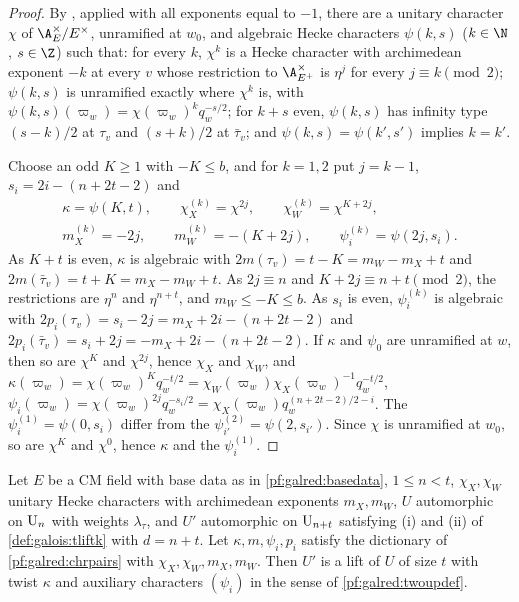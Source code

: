 \begin{proof}
By , applied with all exponents equal to $-1$, there are a unitary character
$\chi$ of $\A_E^\times/E^\times$, unramified at $w_0$, and algebraic Hecke characters $\psi(k,s)$ ($k\in\N$, $s\in\Z$) such
that: for every $k$, $\chi^k$ is a Hecke character with archimedean exponent $-k$ at every $v$ whose restriction to
$\A_{E^+}^\times$ is $\eta^j$ for every $j\equiv k\pmod2$; $\psi(k,s)$ is unramified exactly where $\chi^k$ is, with
$\psi(k,s)(\varpi_w)=\chi(\varpi_w)^kq_w^{-s/2}$; for $k+s$ even, $\psi(k,s)$ has infinity type $(s-k)/2$ at $\tau_v$ and
$(s+k)/2$ at $\bar\tau_v$; and $\psi(k,s)=\psi(k',s')$ implies $k=k'$.

Choose an odd $K\ge1$ with $-K\le b$, and for $k=1,2$ put $j=k-1$, $s_i=2i-(n+2t-2)$ and
\begin{gather*}
  \kappa=\psi(K,t),\qquad\chi^{(k)}_X=\chi^{2j},\qquad\chi^{(k)}_W=\chi^{K+2j},\\
  m^{(k)}_X=-2j,\qquad m^{(k)}_W=-(K+2j),\qquad\psi^{(k)}_i=\psi(2j,s_i).
\end{gather*}
As $K+t$ is even, $\kappa$ is algebraic with $2m(\tau_v)=t-K=m_W-m_X+t$ and $2m(\bar\tau_v)=t+K=m_X-m_W+t$. As $2j\equiv n$ and
$K+2j\equiv n+t\pmod2$, the restrictions are $\eta^n$ and $\eta^{n+t}$, and $m_W\le-K\le b$. As $s_i$ is even,
$\psi^{(k)}_i$ is algebraic with $2p_i(\tau_v)=s_i-2j=m_X+2i-(n+2t-2)$ and $2p_i(\bar\tau_v)=s_i+2j=-m_X+2i-(n+2t-2)$. If
$\kappa$ and $\psi_0$ are unramified at $w$, then so are $\chi^K$ and $\chi^{2j}$, hence $\chi_X$ and $\chi_W$, and
$\kappa(\varpi_w)=\chi(\varpi_w)^Kq_w^{-t/2}=\chi_W(\varpi_w)\chi_X(\varpi_w)^{-1}q_w^{-t/2}$,
$\psi_i(\varpi_w)=\chi(\varpi_w)^{2j}q_w^{-s_i/2}=\chi_X(\varpi_w)q_w^{(n+2t-2)/2-i}$. The $\psi^{(1)}_i=\psi(0,s_i)$ differ
from the $\psi^{(2)}_{i'}=\psi(2,s_{i'})$. Since $\chi$ is unramified at $w_0$, so are $\chi^K$ and $\chi^0$, hence $\kappa$
and the $\psi^{(1)}_i$.
\end{proof}

\begin{proposition}\label{pf:galred:upof}
Let $E$ be a CM field with base data as in \cref{pf:galred:basedata}, $1\le n<t$, $\chi_X,\chi_W$ unitary Hecke characters
with archimedean exponents $m_X,m_W$, $U$ automorphic on $\mathrm{U}_n$ with weights $\lambda_\tau$, and $U'$ automorphic on
$\mathrm{U}_{n+t}$ satisfying (i) and (ii) of \cref{def:galois:tliftk} with $d=n+t$. Let $\kappa,m,\psi_i,p_i$ satisfy the
dictionary of \cref{pf:galred:chrpairs} with $\chi_X,\chi_W,m_X,m_W$. Then $U'$ is a lift of $U$ of size $t$ with twist
$\kappa$ and auxiliary characters $(\psi_i)$ in the sense of \cref{pf:galred:twoupdef}.
\end{proposition}


